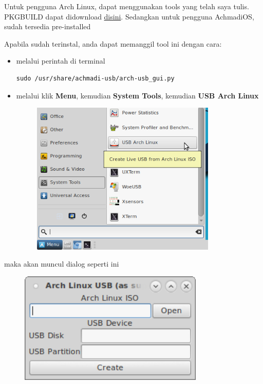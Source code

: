 \documentclass[12pt,]{article}
\begin{document}
	Untuk pengguna Arch Linux, dapat menggunakan tools yang telah saya tulis.
	PKGBUILD dapat didownload \href{https://github.com/mekatronik-achmadi/achmadi-usb/blob/master/PKGBUILD}{disini}.
	Sedangkan untuk pengguna AchmadiOS, sudah tersedia pre-installed
	
	Apabila sudah terinstal, anda dapat memanggil tool ini dengan cara:
	\begin{itemize}
		\item melalui perintah di terminal
		\begin{verbatim}
sudo /usr/share/achmadi-usb/arch-usb_gui.py
		\end{verbatim}
		
		\item melalui klik \textbf{Menu}, kemudian \textbf{System Tools}, kemudian \textbf{USB Arch Linux} 
		
		\begin{figure}[!ht]
			\centering
			\includegraphics[width=250pt]{usbarch/menu}
		\end{figure}
	\end{itemize}

	maka akan muncul dialog seperti ini
	
	\begin{figure}[!ht]
		\centering
		\includegraphics[width=250pt]{usbarch/dialog}
	\end{figure}
\end{document}
